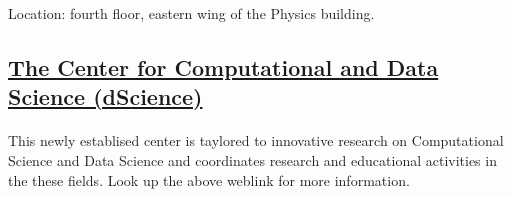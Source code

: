 \documentclass[%
oneside,                 %
final,                   %
10pt]{article}
\begin{document}
Location: fourth floor, eastern wing of the Physics building.

 

\subsection*{\href{{https://www.uio.no/dscience/}}{The Center for Computational and Data Science (dScience)}}


\paragraph{}
This newly establised center is taylored to innovative research on Computational Science and Data Science and coordinates research and educational activities in the these fields. Look up the above weblink for more information.

 


\end{document}
